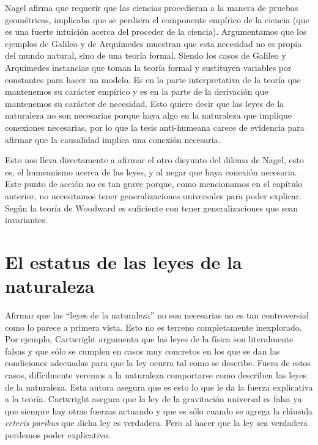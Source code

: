 Nagel afirma que requerir que las ciencias procedieran a la manera de pruebas geométricas, implicaba que se perdiera el componente empírico de la ciencia (que es una fuerte intuición acerca del proceder de la ciencia). Argumentamos que los ejemplos de Galileo y de Arquímedes muestran que esta necesidad no es propia del mundo natural, sino de una teoría formal. Siendo los casos de Galileo y Arquímedes instancias que toman la teoría formal y sustituyen variables por constantes para hacer un modelo. Es en la parte interpretativa de la teoría que mantenemos su carácter empírico y es en la parte de la derivación que mantenemos su carácter de necesidad. Esto quiere decir que las leyes de la naturaleza no son necesarias porque haya algo en la naturaleza que implique conexiones necesarias, por lo que la tesis anti-humeana carece de evidencia para afirmar que la causalidad implica una conexión necesaria.

Esto nos lleva directamente a afirmar el otro disyunto del dilema de Nagel, esto es, el humeanismo acerca de las leyes, y al negar que haya conexión necesaria. Este punto de acción no es tan grave porque, como mencionamos en el capítulo anterior, no necesitamos tener generalizaciones universales para poder explicar. Según la teoría de Woodward es suficiente con tener generalizaciones que sean invariantes.

\section{El estatus de las leyes de la naturaleza}

\noindent Afirmar que las ``leyes de la naturaleza'' no son necesarias no es tan controversial como lo parece a primera vista. Esto no es terreno completamente inexplorado. Por ejemplo, Cartwright \citeyear{Cartwright1983} argumenta que las leyes de la física son literalmente falsas y que sólo se cumplen en casos muy concretos en los que se dan las condiciones adecuadas para que la ley ocurra tal como se describe. Fuera de estos casos, difícilmente veremos a la naturaleza comportarse como describen las leyes de la naturaleza. Esta autora asegura que es esto lo que le da la fuerza explicativa a la teoría. Cartwright asegura que la ley de la gravitación universal es falsa ya que siempre hay otras fuerzas actuando y que es sólo cuando se agrega la cláusula \textit{ceteris paribus} que dicha ley es verdadera. Pero al hacer que la ley sea verdadera perdemos poder explicativo.

